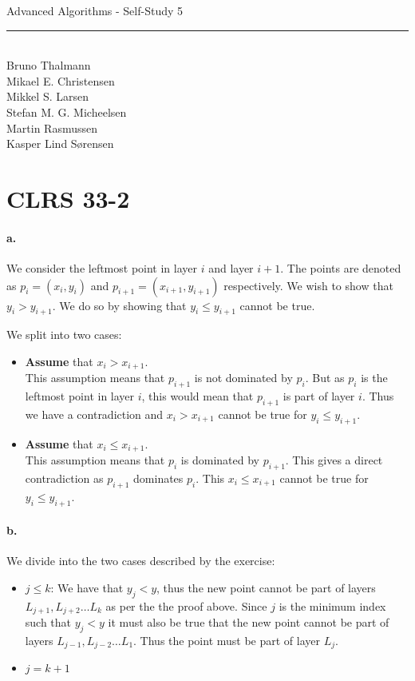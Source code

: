 
\newcommand{\HRule}{\rule{\linewidth}{0.5mm}}


\begin{titlepage}
\centering
{\LARGE Advanced Algorithms - Self-Study 5}
\HRule \\[0.5cm]
Bruno Thalmann\\
			Mikael E. Christensen\\
			Mikkel S. Larsen\\
			Stefan M. G. Micheelsen\\
			Martin Rasmussen\\
			Kasper Lind Sørensen			
\end{titlepage}

\section*{CLRS 33-2}
\paragraph{a.}We consider the leftmost point in layer $i$ and layer $i+1$.
The points are denoted as $p_i = (x_i, y_i)$ and $p_{i +1} = (x_{i +1}, y_{i +1})$ respectively.
We wish to show that $y_i > y_{i +1}$.
We do so by showing that $y_i \leq y_{i +1}$ cannot be true.

We split into two cases:
\begin{itemize}
\item \textbf{Assume} that $x_i > x_{i+1}$.
\\This assumption means that $p_{i+1}$ is not dominated by $p_i$.
But as $p_i$ is the leftmost point in layer $i$, this would mean that $p_{i+1}$ is part of layer $i$.
Thus we have a contradiction and $x_i > x_{i+1}$ cannot be true for $y_i \leq y_{i+1}$.
\item \textbf{Assume} that $x_i \leq x_{i+1}$.
\\This assumption means that $p_i$ is dominated by $p_{i+1}$.
This gives a direct contradiction as $p_{i+1}$ dominates $p_i$.
This $x_i \leq x_{i+1}$ cannot be true for $y_i \leq y_{i+1}$.
\end{itemize}

\paragraph{b.}We divide into the two cases described by the exercise:
\begin{itemize}
\item $j \leq k$: We have that $y_j < y$, thus the new point cannot be part of layers $L_{j+1}, L_{j+2} \dots L_k$ as per the the proof above.
Since $j$ is the minimum index such that $y_j < y$ it must also be true that the new point cannot be part of layers $L_{j-1}, L_{j-2} \dots L_1$.
Thus the point must be part of layer $L_j$.
\item $j = k + 1$
\end{itemize}

